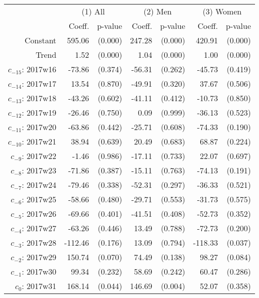 \begin{threeparttable}
\begin{tabular}{@{}r|rr|rr|rr@{}} \hline\hline
 & \multicolumn{2}{c|}{(1) All} & \multicolumn{2}{c|}{(2) Men} &  \multicolumn{2}{c}{(3) Women} \\ 
 & Coeff. & p-value  & Coeff. & p-value & Coeff. & p-value \\ \hline
 Constant & 595.06  & (0.000) & 247.28  & (0.000)  & 420.91  & (0.000) \\ 
 Trend &  1.52  & (0.000) &  1.04  & (0.000)  &  1.00  & (0.000) \\ 
 $ c_{-15} $: 2017w16 & -73.86  & (0.374) & -56.31  & (0.262)  & -45.73  & (0.419) \\ 
 $ c_{-14} $: 2017w17 & 13.54  & (0.870) & -49.91  & (0.320)  & 37.67  & (0.506) \\ 
 $ c_{-13} $: 2017w18 & -43.26  & (0.602) & -41.11  & (0.412)  & -10.73  & (0.850) \\ 
 $ c_{-12} $: 2017w19 & -26.46  & (0.750) &  0.09  & (0.999)  & -36.13  & (0.523) \\ 
 $ c_{-11} $: 2017w20 & -63.86  & (0.442) & -25.71  & (0.608)  & -74.33  & (0.190) \\ 
 $ c_{-10} $: 2017w21 & 38.94  & (0.639) & 20.49  & (0.683)  & 68.87  & (0.224) \\ 
 $ c_{-9} $: 2017w22 & -1.46  & (0.986) & -17.11  & (0.733)  & 22.07  & (0.697) \\ 
 $ c_{-8} $: 2017w23 & -71.86  & (0.387) & -15.11  & (0.763)  & -74.13  & (0.191) \\ 
 $ c_{-7} $: 2017w24 & -79.46  & (0.338) & -52.31  & (0.297)  & -36.33  & (0.521) \\ 
 $ c_{-6} $: 2017w25 & -58.66  & (0.480) & -29.71  & (0.553)  & -31.73  & (0.575) \\ 
 $ c_{-5} $: 2017w26 & -69.66  & (0.401) & -41.51  & (0.408)  & -52.73  & (0.352) \\ 
 $ c_{-4} $: 2017w27 & -63.26  & (0.446) & 13.49  & (0.788)  & -72.73  & (0.200) \\ 
 $ c_{-3} $: 2017w28 & -112.46  & (0.176) & 13.09  & (0.794)  & -118.33  & (0.037) \\ 
 $ c_{-2} $: 2017w29 & 150.74  & (0.070) & 74.49  & (0.138)  & 98.27  & (0.084) \\ 
 $ c_{-1} $: 2017w30 & 99.34  & (0.232) & 58.69  & (0.242)  & 60.47  & (0.286) \\ 
 $ c_{0} $: 2017w31 & 168.14  & (0.044) & 146.69  & (0.004)  & 52.07  & (0.358) \\ 

\end{tabular}
\end{threeparttable}
